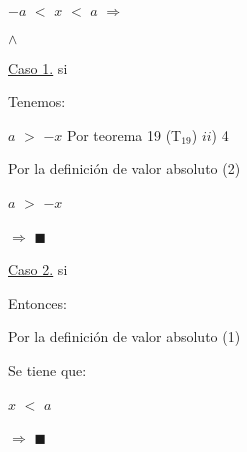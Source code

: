 \documentclass[12pt]{article}
\renewcommand{\qedsymbol}{$\blacksquare$}
\begin{document}
{} {{\Large{$-a$ $<$ $x$ $<$ $a$ $\Longrightarrow$ {}}}} \vspace{0.5cm}

{} \vspace{0.5cm} 

{} {} $\wedge$ {} \vspace{0.5cm} 

{\textcolor{palatinateblue}{{\underline{Caso 1.}} }} si {}\vspace{0.5cm}

{\textcolor{palatinateblue}{Tenemos:}} \vspace{0.5cm}

\hspace{4cm} $ a $ $>$ $-x$ \hspace{0.4cm} {\textcolor{carrotorange}{Por teorema 19 (T$_{19}$) $ii$) 4}} \vspace{0.5cm}

{\textcolor{carrotorange}{Por la definición de valor absoluto (2)}} \vspace{0.5cm}

\hspace{4cm} $ a$ $>$ $-x$ \hspace{0.4cm} \vspace{0.5cm}

\hspace{2.7cm} $\Longrightarrow$ \hspace{0.2cm} {} \hspace{0.4cm} {\textcolor{carrotorange}{\qedsymbol}} \vspace{0.5cm}


{\textcolor{palatinateblue}{{\underline{Caso 2.}} }} si {\Large{{}}}\vspace{0.5cm}

{\textcolor{palatinateblue}{Entonces:}} \vspace{0.5cm}

{\textcolor{carrotorange}{Por la definición de valor absoluto (1)}} \vspace{0.5cm}

{\textcolor{palatinateblue}{Se tiene que:}} \vspace{0.5cm}

\hspace{4cm} $x$ $<$ $a$ \hspace{0.4cm} \vspace{0.5cm}

\hspace{2.1cm} $\Longrightarrow$ \hspace{0.2cm} {} \hspace{0.4cm} {\textcolor{carrotorange}{\qedsymbol}} \vspace{0.5cm}
\end{document}
